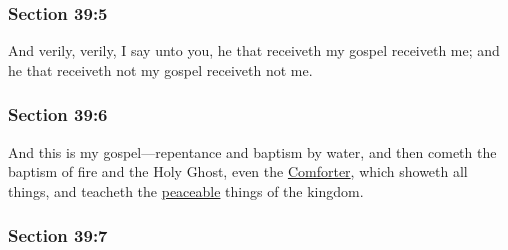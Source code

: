 
	\subsubsection{Section 39:5} %
		\label{DC39-5}

		And verily, verily, I say unto you, he that receiveth my gospel receiveth me; and he that receiveth not my gospel receiveth not me.


	\subsubsection{Section 39:6} %
		\label{DC39-6}

		And this is my gospel---repentance and baptism by water, and then cometh the baptism of fire and the Holy Ghost, even the \hyperref[COMFORTER]{Comforter}, which showeth all things, and teacheth the \hyperref[PEACEABLE]{peaceable} things of the kingdom.


	\subsubsection{Section 39:7} %
		\label{DC39-7}

